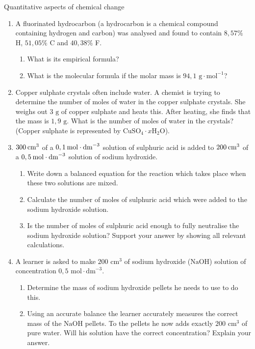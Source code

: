 \begin{eocexercises}{Quantitative aspects of chemical change}
\begin{enumerate}[noitemsep, label=\textbf{\arabic*}. ]
\item A fluorinated hydrocarbon (a hydrocarbon is a chemical compound containing hydrogen and carbon) was analysed and found to contain $8,57\%$ H, $51,05\%$ C and $40,38\%$ F.
 \begin{enumerate}[noitemsep, label=\textbf{\alph*}. ] 
 \item What is its empirical formula?
 \item What is the molecular formula if the molar mass is $94,1\text{ g}\cdot {\text{mol}}^{-1}$?
 \end{enumerate}
\item Copper sulphate crystals often include water. A chemist is trying to determine the number of moles of water in the copper sulphate crystals. She weighs out $3 \text{ g}$ of copper sulphate and heats this. After heating, she finds that the mass is $1,9 \text{ g}$. What is the number of moles of water in the crystals? (Copper sulphate is represented by ${\text{CuSO}}_{4}\cdot x{\text{H}}_{2}\text{O}$).        
\item $300\phantom{\rule{2pt}{0ex}}{\text{cm}}^{3}$ of a $0,1\phantom{\rule{2pt}{0ex}}\text{mol}\ensuremath{\cdot}{\text{dm}}^{-3}$ solution of sulphuric acid is added to $200\phantom{\rule{2pt}{0ex}}{\text{cm}}^{3}$ of a $0,5\phantom{\rule{2pt}{0ex}}\text{mol}\ensuremath{\cdot}{\text{dm}}^{-3}$ solution of sodium hydroxide.
 \begin{enumerate}[noitemsep, label=\textbf{\alph*}. ] 
 \item Write down a balanced equation for the reaction which takes place when these two solutions are mixed.
 \item Calculate the number of moles of sulphuric acid which were added to the sodium hydroxide solution.
 \item Is the number of moles of sulphuric acid enough to fully neutralise the sodium hydroxide solution? Support your answer by showing all relevant calculations.
 \end{enumerate}
\item A learner is asked to make $200 {\text{ cm}}^{3}$ of sodium hydroxide ($\text{NaOH}$) solution of concentration $0,5 \text{ mol} \cdot {\text{dm}}^{-3}$.
 \begin{enumerate}[noitemsep, label=\textbf{\alph*}. ] 
 \item Determine the mass of sodium hydroxide pellets he needs to use to do this.
 \item Using an accurate balance the learner accurately measures the correct mass of the $\text{NaOH}$ pellets. To the pellets he now adds exactly $200 {\text{ cm}}^{3}$ of pure water. Will his solution have the correct concentration? Explain your answer.

\end{enumerate}
\end{enumerate}
\end{eocexercises}
